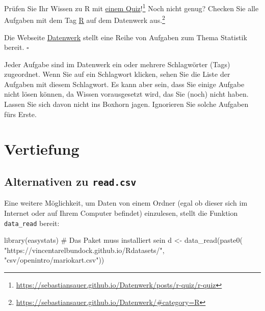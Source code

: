 \documentclass[
  letterpaper,
  twoside,
  open=any]{scrbook}
\newenvironment{Shaded}{\begin{snugshade}}{\end{snugshade}}
\newcommand{\CommentTok}[1]{\textcolor[rgb]{0.37,0.37,0.37}{#1}}
\newcommand{\FunctionTok}[1]{\textcolor[rgb]{0.28,0.35,0.67}{#1}}
\newcommand{\NormalTok}[1]{\textcolor[rgb]{0.00,0.23,0.31}{#1}}
\newcommand{\OtherTok}[1]{\textcolor[rgb]{0.00,0.23,0.31}{#1}}
\newcommand{\StringTok}[1]{\textcolor[rgb]{0.13,0.47,0.30}{#1}}
\theoremstyle{definition}
\theoremstyle{definition}
\theoremstyle{definition}
\theoremstyle{remark}
\begin{document}
Prüfen Sie Ihr Wissen zu R mit
\href{https://sebastiansauer.github.io/Datenwerk/posts/r-quiz/r-quiz}{einem
Quiz}!\footnote{\url{https://sebastiansauer.github.io/Datenwerk/posts/r-quiz/r-quiz}}
Noch nicht genug? Checken Sie alle Aufgaben mit dem Tag
\href{https://sebastiansauer.github.io/Datenwerk/\#category=R}{R} auf
dem Datenwerk aus.\footnote{\url{https://sebastiansauer.github.io/Datenwerk/\#category=R}}

\begin{tcolorbox}[enhanced jigsaw, colframe=quarto-callout-note-color-frame, arc=.35mm, leftrule=.75mm, bottomtitle=1mm, titlerule=0mm, colbacktitle=quarto-callout-note-color!10!white, breakable, bottomrule=.15mm, colback=white, left=2mm, rightrule=.15mm, opacityback=0, toptitle=1mm, toprule=.15mm, opacitybacktitle=0.6, title=\textcolor{quarto-callout-note-color}{\faInfo}\hspace{0.5em}{Hinweis}, coltitle=black]

Die Webseite
\href{https://sebastiansauer.github.io/Datenwerk/}{Datenwerk} stellt
eine Reihe von Aufgaben zum Thema Statistik bereit. \(\square\)

\end{tcolorbox}

Jeder Aufgabe sind im Datenwerk ein oder mehrere Schlagwörter (Tags)
zugeordnet. Wenn Sie auf ein Schlagwort klicken, sehen Sie die Liste der
Aufgaben mit diesem Schlagwort. Es kann aber sein, dass Sie einige
Aufgabe nicht lösen können, da Wissen vorausgesetzt wird, das Sie (noch)
nicht haben. Lassen Sie sich davon nicht ins Boxhorn jagen. Ignorieren
Sie solche Aufgaben fürs Erste.

\section{Vertiefung}\label{vertiefung-1}

\subsection{\texorpdfstring{Alternativen zu
\texttt{read.csv}}{Alternativen zu read.csv}}\label{alternativen-zu-read.csv}

Eine weitere Möglichkeit, um Daten von einem Ordner (egal ob dieser sich
im Internet oder auf Ihrem Computer befindet) einzulesen, stellt die
Funktion \texttt{data\_read} bereit:

\begin{Shaded}
\begin{Highlighting}[]
\FunctionTok{library}\NormalTok{(easystats)  }\CommentTok{\# Das Paket muss installiert sein}
\NormalTok{d }\OtherTok{\textless{}{-}} \FunctionTok{data\_read}\NormalTok{(}\FunctionTok{paste0}\NormalTok{(}
  \StringTok{"https://vincentarelbundock.github.io/Rdatasets/"}\NormalTok{,}
  \StringTok{"csv/openintro/mariokart.csv"}\NormalTok{))}
\end{Highlighting}
\end{Shaded}
\end{document}
